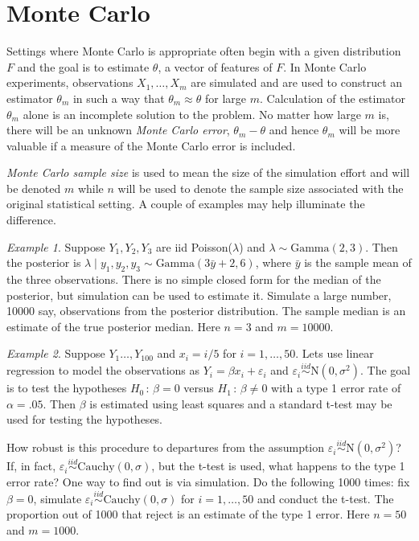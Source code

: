 \documentclass[12pt]{article}
\theoremstyle{plain}
\theoremstyle{definition}
\theoremstyle{remark}
\newtheorem{example}{Example}[section]
\begin{document}
\section{Monte Carlo}
\label{gofmc:sec:Monte Carlo}

Settings where Monte Carlo is appropriate often begin with a given
distribution $F$ and the goal is to estimate $\theta$, a vector of
features of $F$.  In Monte Carlo experiments, observations
$X_{1}, \ldots, X_{m}$ are simulated and are used to construct an
estimator $\theta_m$ in such a way that $\theta_m \approx \theta$ for
large $m$.  Calculation of the estimator $\theta_m$ alone is an
incomplete solution to the problem. No matter how large $m$ is, there
will be an unknown \textit{Monte Carlo error}, $\theta_m - \theta$ and
hence $\theta_m$ will be more valuable if a measure of the
Monte Carlo error is included. 

\textit{Monte Carlo sample size} is used to mean the size of the
simulation effort and  will be denoted $m$ while $n$ will be used to
denote the sample size associated with the original statistical
setting.  A couple of examples may help illuminate the difference.

\begin{example}
  Suppose $Y_1,Y_2, Y_3$ are iid Poisson($\lambda$) and $\lambda \sim
  \text{Gamma}(2,3)$.  Then the posterior is $\lambda \mid y_1, y_2, y_3
  \sim \text{Gamma}(3\bar{y} + 2, 6)$, where $\bar{y}$ is the sample
  mean of the three observations.  There is no simple closed form for
  the median of the posterior, but simulation can be used to estimate
  it.  Simulate a large number, 10000 say, observations from the
  posterior distribution.  The sample median is an estimate of the
  true posterior median.  Here $n=3$ and $m=10000$.
\end{example}

\begin{example}
  Suppose $Y_1 \ldots, Y_{100}$ and $x_i = i/5$ for $i=1,
  \ldots, 50$. Lets use linear regression to model the observations
  as $Y_i=\beta x_i + \varepsilon_i$ and $\varepsilon_i
  \stackrel{iid}{\sim}\text{N}(0, \sigma^2)$.  The goal is to test the
  hypotheses $H_0 \, : \, \beta=0$ versus $H_1 \, : \, \beta \neq 0$
  with a type 1 error rate of $\alpha=.05$.  Then $\beta$ is estimated
  using least squares and a standard t-test may be used for testing the
  hypotheses.

  How robust is this procedure to departures from the assumption
  $\varepsilon_i \stackrel{iid}{\sim}\text{N}(0, \sigma^2)$?  If, in
  fact, $\varepsilon_i \stackrel{iid}{\sim} \text{Cauchy}(0, \sigma)$,
  but the t-test is used, what happens to the type 1 error
  rate?  One way to find out is via simulation.  Do the following 1000
  times: fix $\beta=0$, simulate $\varepsilon_i \stackrel{iid}{\sim}
  \text{Cauchy}(0, \sigma)$ for $i=1, \ldots, 50$ and conduct the
  t-test.  The proportion out of 1000 that reject is an estimate of
  the type 1 error.  Here $n=50$ and $m = 1000$.
\end{example}
\end{document}
